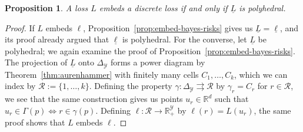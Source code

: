 \documentclass[12pt]{article}
\newcommand{\Comments}{1}
\newcommand{\mynote}[2]{\ifnum\Comments=1\textcolor{#1}{#2}\fi}
\newcommand{\raf}[1]{\mynote{green}{[RF: #1]}}
\newcommand{\reals}{\mathbb{R}}
\newcommand{\prop}[1]{\mathrm{prop}[#1]}
\newcommand{\simplex}{\Delta_\Y}
\newcommand{\R}{\mathcal{R}}
\newcommand{\U}{\mathcal{U}}
\newcommand{\Y}{\mathcal{Y}}
\newcommand{\risk}[1]{\underline{#1}}
\newcommand{\inter}[1]{\mathring{#1}}%
\newcommand{\toto}{\rightrightarrows}
\DeclareMathOperator*{\argmin}{arg\,min}
\newtheorem{proposition}{Proposition}
\begin{document}
\begin{proposition}\label{prop:embed-risk-poly}
  A loss $L$ embeds a discrete loss if and only if $\risk{L}$ is polyhedral.
\end{proposition}
\begin{proof}
  If $L$ embeds $\ell$, Proposition~\ref{prop:embed-bayes-risks} gives us $\risk{L} = \risk{\ell}$, and its proof already argued that $\risk{\ell}$ is polyhedral.
  For the converse, let $\risk{L}$ be polyhedral; we again examine the proof of Proposition~\ref{prop:embed-bayes-risks}.
  The projection of $\risk{L}$ onto $\simplex$ forms a power diagram by Theorem~\ref{thm:aurenhammer} with finitely many cells $C_1,\ldots,C_k$, which we can index by $\R := \{1,\ldots,k\}$.
  Defining the property $\gamma:\simplex\toto\R$ by $\gamma_r = C_r$ for $r\in\R$, we see that the same construction gives us points $u_r \in\reals^d$ such that $u_r \in \Gamma(p) \iff r \in \gamma(p)$.
  Defining $\ell:\R\to\reals^\Y_+$ by $\ell(r) = L(u_r)$, the same proof shows that $L$ embeds $\ell$.

\end{proof}
\end{document}
